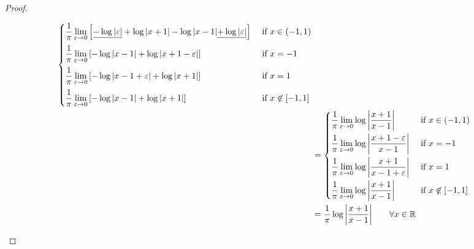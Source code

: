 \documentclass{article} %
\theoremstyle{plain}
\newcommand{\E}{\varepsilon}
\def\Rl{\mathbb{R}}
\numberwithin{equation}{section} %
\numberwithin{figure}{section} %
\numberwithin{table}{section} %
\begin{document}
\begin{proof}
\begin{enumerate}[(a)]
\begin{align*}
\begin{cases}
                \displaystyle\frac{1}{\pi}\lim_{\E\rightarrow 0}\qty[\underline{-\log\abs{\E}} + \log\abs{x + 1} - \log\abs{x - 1} \underline{+ \log\abs{\E}}] & \text{ if } x \in (-1, 1) \\[.3cm]
                \displaystyle\frac{1}{\pi}\lim_{\E\rightarrow 0} \qty[-\log\abs{x - 1} + \log\abs{x + 1 - \E}] & \text{ if } x = -1 \\[.3cm]
                \displaystyle\frac{1}{\pi}\lim_{\E\rightarrow 0} \qty[-\log\abs{x - 1 + \E} + \log\abs{x + 1}] & \text{ if } x = 1 \\[.3cm]
                \displaystyle\frac{1}{\pi}\lim_{\E\rightarrow 0} \qty[-\log\abs{x - 1} + \log\abs{x + 1}] & \text{ if } x \not\in [-1, 1]
            \end{cases} \\
            &= \begin{cases}
                \displaystyle\frac{1}{\pi} \lim_{\E\rightarrow 0}\log\abs{\frac{x + 1}{x - 1}} & \text{ if } x \in (-1, 1) \\[0.3cm]
                \displaystyle\frac{1}{\pi} \lim_{\E\rightarrow 0}\log\abs{\frac{x + 1 - \E}{x - 1}} & \text{ if } x = -1 \\[0.3cm]
                \displaystyle\frac{1}{\pi} \lim_{\E\rightarrow 0}\log\abs{\frac{x + 1}{x - 1 + \E}} & \text{ if } x = 1 \\[0.3cm]
                \displaystyle\frac{1}{\pi} \lim_{\E\rightarrow 0}\log\abs{\frac{x + 1}{x - 1}} & \text{ if } x \not\in [-1, 1]
            \end{cases} \\
            &= \frac{1}{\pi}\log\abs{\frac{x + 1}{x - 1}} \qquad \forall x \in \Rl
            \end{align*}
    \end{enumerate}
\end{proof}
\end{document}
